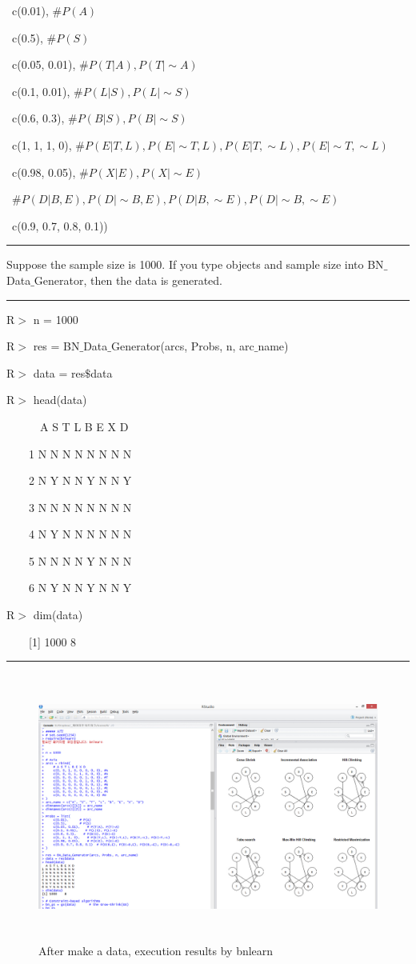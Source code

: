 	~c(0.01),						$\# P(A)$
	
	~c(0.5), 						$\# P(S)$
	
	~c(0.05, 0.01),				$\# P(T|A), P(T|\sim A)$
	
	~c(0.1, 0.01),				$\# P(L|S), P(L|\sim S)$
	
	~c(0.6, 0.3),					$\# P(B|S), P(B|\sim S)$
	
	~c(1, 1, 1, 0),				$\# P(E|T,L), P(E|\sim T,L), P(E|T,\sim L), P(E|\sim T,\sim L)$
	
	~c(0.98, 0.05),				$\# P(X|E), P(X|\sim E)$

	~$\# P(D|B,E), P(D|\sim B,E), P(D|B,\sim E), P(D|\sim B,\sim E)$
	
	~c(0.9, 0.7, 0.8, 0.1))

\begin{center}\rule[0.5ex]{0.9\columnwidth}{1pt}\end{center}

Suppose the sample size is 1000. If you type objects and sample size into BN$\_$Data$\_$Generator, then the data is generated.

\begin{center}\rule[0.5ex]{0.9\columnwidth}{1pt}\end{center}

R$>$ n = 1000
 
R$>$ res = BN$\_$Data$\_$Generator(arcs, Probs, n, arc$\_$name)

R$>$ data = res$\$$data

R$>$ head(data)

~~~~~~A S T L B E X D
  
~~~~1 N N N N N N N N

~~~~2 N Y N N Y N N Y

~~~~3 N N N N N N N N

~~~~4 N Y N N N N N N

~~~~5 N N N N Y N N N

~~~~6 N Y N N Y N N Y

R$>$ dim(data)

~~~~[1] 1000    8

\begin{center}\rule[0.5ex]{0.9\columnwidth}{1pt}\end{center}

\begin{figure}[h]
	\centering
	\includegraphics[height=250pt]{images/image23}
	\caption{After make a data, execution results by bnlearn}
\end{figure}